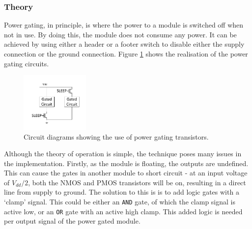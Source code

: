\subsubsection{Theory}

Power gating, in principle, is where the power to a module is switched off when not in use. 
By doing this, the module does not consume any power. 
It can be achieved by using either a header or a footer switch to disable either the supply connection or the ground connection. 
Figure \ref{fig:powerswitches} shows the realisation of the power gating circuits.

\begin{figure}[h]
\centering
\includegraphics[width=0.3\textwidth]{Figures/powergating_switches.pdf}
\caption{Circuit diagrams showing the use of power gating transistors.}%
\label{fig:powerswitches}
\end{figure}



Although the theory of operation is simple, the technique poses many issues in the implementation.
Firstly, as the module is floating, the outputs are undefined.
This can cause the gates in another module to short circuit - at an input voltage of $ V_{dd} / 2 $, both the NMOS and PMOS transistors will be on, resulting in a direct line from supply to ground. 
The solution to this is is to add logic gates with a `clamp' signal. 
This could be either an \texttt{AND} gate, of which the clamp signal is active low, or an \texttt{OR} gate with an active high clamp. 
This added logic is needed per output signal of the power gated module.

